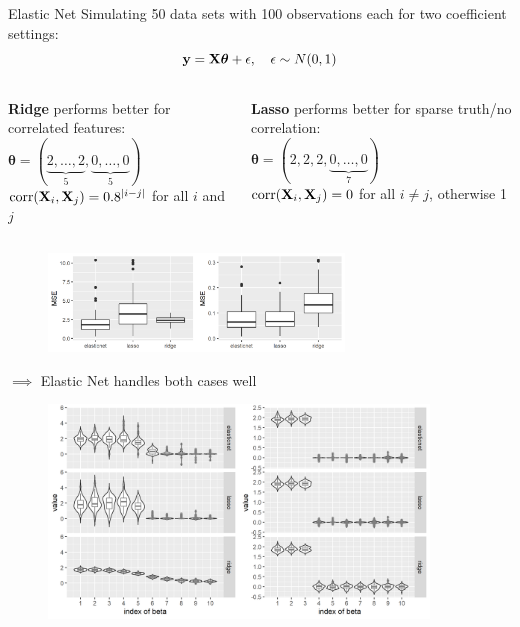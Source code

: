 \documentclass[11pt,compress,t,notes=noshow, xcolor=table]{beamer}
\begin{document}
\begin{vbframe} {Elastic Net}
\framebreak
\footnotesize
Simulating 50 data sets with 100 observations each for two coefficient settings: \\
\vspace{-0.3cm}
$$\mathbf{y} =\mathbf{X} \boldsymbol{\theta}+ \epsilon, \quad \epsilon \sim N(0,1)$$
\vspace{-0.3cm}
\begin{columns}
\begin{column}{0.5\textwidth}
\begin{center}
{\footnotesize \textbf{Ridge} performs better for correlated features}: \\ 
$\boldsymbol{\theta}=(\underbrace{2,\ldots,2}_{5},\underbrace{0,\ldots,0}_{5})$\\
$ \operatorname{corr}(\mathbf{X}_{i},\mathbf{X}_{j})=0.8^{|i-j|}$ for all $i$ and $j$
  \end{center}
\end{column}
\begin{column}{0.5\textwidth} 
\begin{center}
{\footnotesize \textbf{Lasso} performs better for sparse truth/no correlation:} \\
$\boldsymbol{\theta}=(2, 2, 2,\underbrace{0,\ldots,0}_{7})$ \\
$\operatorname{corr}(\mathbf{X}_{i},\mathbf{X}_{j})= 0$ for all $i \neq j$, otherwise 1
\end{center}
\end{column}
\end{columns}

\begin{figure}
\includegraphics[width=0.7\textwidth]{figure/enet_lasso_ridge_mse.png}\\
\end{figure}
{\normalsize $\implies$ Elastic Net handles both cases well}
\framebreak

\begin{figure}
\includegraphics[width=0.9\textwidth]{figure/enet_tradeoff.png}\\
\end{figure}



\end{vbframe}
\end{document}
